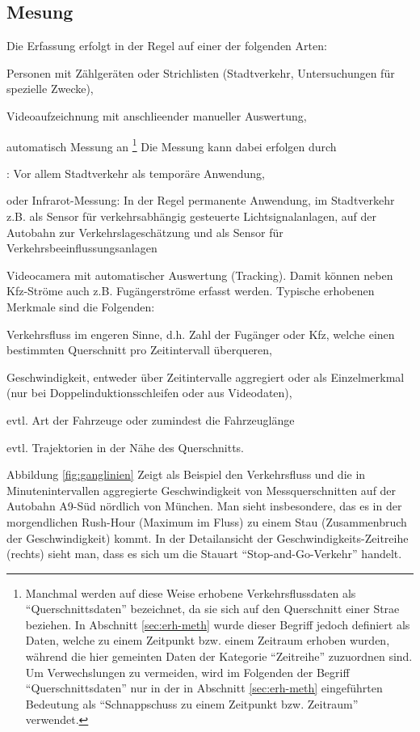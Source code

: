 \subsection{Mesung}
 Die Erfassung erfolgt in der Regel auf einer der
folgenden Arten:
\bi
\item Personen mit Z\"ahlger\"aten oder Strichlisten (Stadtverkehr,
Untersuchungen f\"ur spezielle Zwecke),
\item Videoaufzeichnung mit anschlie\3ender manueller  Auswertung,
\item automatisch Messung an 
\footnote{Manchmal werden auf diese Weise
erhobene  Verkehrsflussdaten
als ``Querschnittsdaten'' bezeichnet, da sie sich auf den Querschnitt
einer Stra\3e beziehen. In Abschnitt \ref{sec:erh-meth}
wurde dieser Begriff jedoch  definiert als Daten, welche
 zu einem Zeitpunkt bzw. einem
Zeitraum erhoben wurden, w\"ahrend die hier gemeinten Daten der
Kategorie ``Zeitreihe'' zuzuordnen sind.
Um Verwechslungen zu vermeiden, wird 
im Folgenden der Begriff ``Querschnittsdaten'' nur in der in 
 Abschnitt \ref{sec:erh-meth} eingef\"uhrten
Bedeutung als ``Schnappschuss zu einem Zeitpunkt bzw. Zeitraum'' verwendet.}
Die Messung kann dabei erfolgen durch
\bi
\item {}: 
Vor allem Stadtverkehr als  tempor\"are Anwendung,
\item  {} oder Infrarot-Messung: 
In der Regel permanente Anwendung, im Stadtverkehr
z.B. als Sensor f\"ur verkehrsabh\"angig gesteuerte
Lichtsignalanlagen, auf der Autobahn zur Verkehrslagesch\"atzung und
als Sensor f\"ur Verkehrsbeeinflussungsanlagen
\item Videocamera mit automatischer Auswertung (Tracking). Damit
k\"onnen neben Kfz-Str\"ome auch z.B. Fu\3g\"angerstr\"ome erfasst werden.
\ei
\ei
\noindent
Typische  erhobenen Merkmale sind die Folgenden:
\bi
\item  Verkehrsfluss im engeren Sinne, d.h. Zahl der Fu\3g\"anger oder
Kfz, welche einen bestimmten Querschnitt pro Zeitintervall
\"uberqueren,
\item Geschwindigkeit, entweder \"uber Zeitintervalle aggregiert
 oder als Einzelmerkmal (nur bei Doppelinduktionsschleifen oder aus
Videodaten),
\item evtl. Art der Fahrzeuge oder zumindest die Fahrzeugl\"ange
\item evtl. Trajektorien in der N\"ahe des Querschnitts.
\ei

\noindent
Abbildung \ref{fig:ganglinien} Zeigt als Beispiel den Verkehrsfluss
und die in Minutenintervallen aggregierte Geschwindigkeit von
Messquerschnitten auf der Autobahn A9-S\"ud n\"ordlich von M\"unchen. Man
sieht insbesondere, das es in der morgendlichen Rush-Hour (Maximum im
Fluss) zu einem Stau (Zusammenbruch der Geschwindigkeit) kommt. In der
Detailansicht der Geschwindigkeits-Zeitreihe (rechts) sieht man, dass
es sich um
die Stauart ``Stop-and-Go-Verkehr'' handelt.

